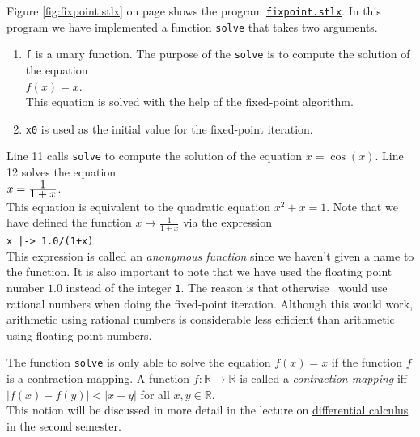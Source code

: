 Figure \ref{fig:fixpoint.stlx} on page \pageref{fig:fixpoint.stlx} shows the program
\href{https://github.com/karlstroetmann/Logik/blob/master/SetlX/fixpoint.stlx}{\texttt{fixpoint.stlx}}.
In this program we have implemented a function \texttt{solve} that takes two arguments.
\begin{enumerate}
\item \texttt{f} is a unary function.  The purpose of the \texttt{solve} is to compute the solution of the equation
      \\[0.2cm]
      \hspace*{1.3cm}
      $f(x) = x$.
      \\[0.2cm]
      This equation is solved with the help of the fixed-point algorithm.
\item \texttt{x0} is used as the initial value for the fixed-point iteration.
\end{enumerate}
Line 11 calls \texttt{solve} to compute the solution of the equation $x = \cos(x)$.
Line 12 solves the equation 
\\[0.2cm]
\hspace*{1.3cm}
$x = \frac{\displaystyle1}{\displaystyle 1+x}$. 
\\[0.2cm]
This equation is equivalent to the quadratic equation $x^2 + x = 1$.  Note that we have defined the function
 $x \mapsto \frac{1}{1+x}$ via the expression
\\[0.2cm]
\hspace*{1.3cm}
\texttt{x |-> 1.0/(1+x)}.
\\[0.2cm]
This expression is called an \emph{anonymous function} since we haven't given a name to the function.  It is
also important to note that we have used the floating point number  $1.0$ instead of the integer \texttt{1}.
The reason is that otherwise \setlx\ would use rational numbers when doing the fixed-point iteration.  Although this would
work, arithmetic using rational numbers is considerable less efficient than arithmetic using floating point
numbers. 

\remarkEng
The function \texttt{solve} is only able to solve the equation $f(x) = x$ if the function $f$ is a 
\href{https://en.wikipedia.org/wiki/Contraction_mapping}{contraction mapping}.  A function 
$f:\mathbb{R} \rightarrow \mathbb{R}$
is called a \emph{contraction mapping} iff 
\\[0.2cm]
\hspace*{1.3cm}
$|f(x) - f(y)| < |x - y|$ \quad for all $x,y \in \mathbb{R}$.
\\[0.2cm]
This notion will be discussed in more detail in the lecture on 
\href{https://github.com/karlstroetmann/Analysis/blob/master/Script/analysis.pdf}{differential
  calculus} in the second semester. \eox 

